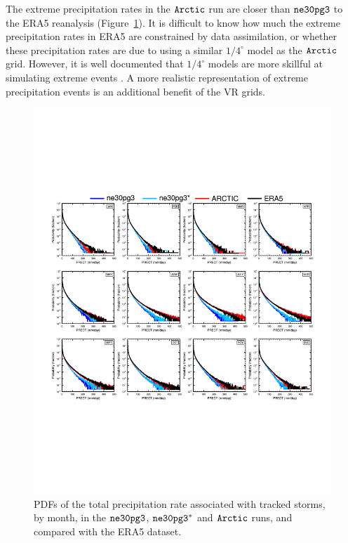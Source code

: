 \documentclass[draft]{agujournal2019}
\begin{document}
The extreme precipitation rates in the $\tt Arctic$ run are closer than $\tt ne30pg3$ to the ERA5 reanalysis (Figure~\ref{fig:comp-pdf}). It is difficult to know how much the extreme precipitation rates in ERA5 are constrained by data assimilation, or whether these precipitation rates are due to using a similar $1/4^{\circ}$ model as the $\tt Arctic$ grid. However, it is well documented that $1/4^{\circ}$ models are more skillful at simulating extreme events \cite{BetAl2013JC,OETAL2016JAMES}.  A more realistic representation of extreme precipitation events is an additional benefit of the VR grids.

\begin{figure}[t]
\begin{center}
         \includegraphics[width=130mm]{figs/temp_composite_ge45N_pdf.pdf}
\end{center}
\caption{PDFs of the total precipitation rate associated with tracked storms, by month, in the $\tt ne30pg3$, $\tt ne30pg3^{*}$ and $\tt Arctic$ runs, and compared with the ERA5 dataset.}
\label{fig:comp-pdf}
\end{figure}
\end{document}

